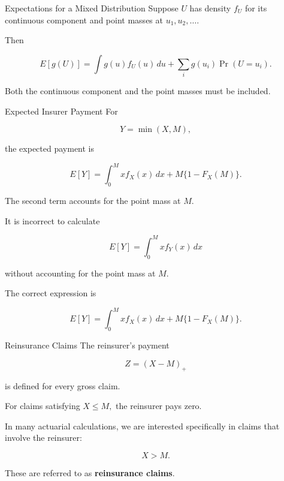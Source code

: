 \documentclass[
  ignorenonframetext,
  aspectratio=169,
]{beamer}
\begin{document}
\begin{frame}{Expectations for a Mixed Distribution}
\protect{}\label{expectations-for-a-mixed-distribution}
Suppose \(U\) has density \(f_U\) for its continuous component and point
masses at \(u_1,u_2,\ldots\).

Then

\[
\boxed{
E[g(U)]
=
\int g(u)f_U(u)\,du
+
\sum_i g(u_i)\Pr(U=u_i).
}
\]

Both the continuous component and the point masses must be included.
\end{frame}

\begin{frame}{Expected Insurer Payment}
\protect{}\label{expected-insurer-payment}
For

\[
Y=\min(X,M),
\]

the expected payment is

\[
\boxed{
E[Y]
=
\int_0^M x f_X(x)\,dx
+
M\{1-F_X(M)\}.
}
\]

The second term accounts for the point mass at \(M\).
\end{frame}

\begin{frame}
\begin{tcolorbox}[enhanced jigsaw, arc=.35mm, bottomrule=.15mm, bottomtitle=1mm, breakable, colback=white, colbacktitle=quarto-callout-warning-color!10!white, colframe=quarto-callout-warning-color-frame, coltitle=black, left=2mm, leftrule=.75mm, opacityback=0, opacitybacktitle=0.6, rightrule=.15mm, title=\textcolor{quarto-callout-warning-color}{\faExclamationTriangle}\hspace{0.5em}{Do not ignore the point mass}, titlerule=0mm, toprule=.15mm, toptitle=1mm]

It is incorrect to calculate

\[
E[Y]
=
\int_0^M x f_Y(x)\,dx
\]

without accounting for the point mass at \(M\).

The correct expression is

\[
E[Y]
=
\int_0^M x f_X(x)\,dx
+
M\{1-F_X(M)\}.
\]

\end{tcolorbox}
\end{frame}

\begin{frame}{Reinsurance Claims}
\protect{}\label{reinsurance-claims-1}
The reinsurer's payment

\[
Z=(X-M)_+
\]

is defined for every gross claim.

For claims satisfying \(X\leq M,\) the reinsurer pays zero.

In many actuarial calculations, we are interested specifically in claims
that involve the reinsurer:

\[
\boxed{X>M}.
\]

These are referred to as \textbf{reinsurance claims}.
\end{frame}
\end{document}
